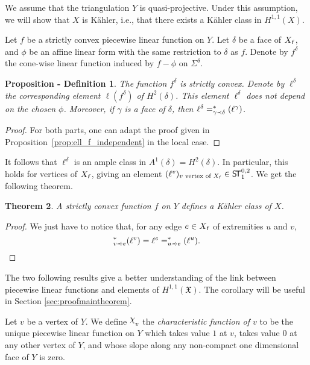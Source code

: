 \documentclass[11pt]{amsart}
\newtheorem{thm}{Theorem}[section]
\newtheorem{propdefi}[thm]{Proposition - Definition}
\theoremstyle{definition}
\numberwithin{equation}{section}
\newcommand{\ie}{i.e.}
\renewcommand{\~}{\widetilde}
\let\oldchi\chi
\newcommand{\raisechi}[2]{\raisebox{.4ex}{$#1#2$}}
\renewcommand{\chi}{{\mathpalette\raisechi\oldchi}}
\newcommand{\f}{{\textnormal{\textsl{\textsf f}}}} %
\let\i\relax
\newcommand{\i}{{\mathop{}\mathrm{i}}} %
\newcommand{\X}{\mathfrak X}
\newcommand{\subface}{\prec}
\newcommand{\ssubface}{\mathbin{\mathchoice
  {\subface\!\!\!\cdot}%
  {\subface\!\!\!\cdot}%
  {\subface\!\cdot}%
  {\subface\!\cdot}%
}} %
\newcommand{\ST}{\textnormal{\textsf{S\!T}}} %
\begin{document}
We assume that the triangulation $Y$ is quasi-projective. Under this assumption, we will show that $X$ is Kähler, \ie, that there exists a Kähler class in $H^{1,1}(X)$.

\medskip

Let $f$ be a strictly convex piecewise linear function on $Y$. Let $\delta$ be a face of $X_\f$, and $\phi$ be an affine linear form with the same restriction to $\delta$ as $f$. Denote by $f^\delta$ the cone-wise linear function induced by $f-\phi$ on $\Sigma^\delta$.

\begin{propdefi} \label{propdefi:convex_subface}
The function $f^\delta$ is strictly convex. Denote by $\ell^\delta$ the corresponding element $\ell(f^\delta)$ of $H^2(\delta)$. This element $\ell^\delta$ does not depend on the chosen $\phi$. Moreover, if $\gamma$ is a face of $\delta$, then $\ell^\delta=\i^*_{\gamma\subface\delta}(\ell^\gamma)$.
\end{propdefi}

\begin{proof}
For both parts, one can adapt the proof given in Proposition~\ref{prop:ell_f_independent} in the local case.
\end{proof}

It follows that $\ell^\delta$ is an ample class in $A^1(\delta) = H^2(\delta)$. In particular, this holds for vertices of $X_\f$, giving an element $(\ell^v)_{v \text{ vertex of } X_\f}\in\ST^{0,2}_1$. We get the following theorem.

\begin{thm} \label{thm:projective_Kahler}
A strictly convex function $f$ on $Y$ defines a Kähler class of $X$.
\end{thm}
\begin{proof}
We just have to notice that, for any edge $e\in X_\f$ of extremities $u$ and $v$,
\[ \i^*_{v\ssubface e}(\ell^v)=\ell^e=\i^*_{u\ssubface e}(\ell^u). \qedhere \]
\end{proof}

\medskip

The two following results give a better understanding of the link between piecewise linear functions and elements of $H^{1,1}(\X)$. The corollary will be useful in Section \ref{sec:proofmaintheorem}.

Let $v$ be a vertex of $Y$. We define $\chi_v$ the \emph{characteristic function of $v$} to be the unique piecewise linear function on $Y$ which takes value $1$ at $v$, takes value $0$ at any other vertex of $Y$, and whose slope along any non-compact one dimensional face of $Y$ is zero.
\end{document}
